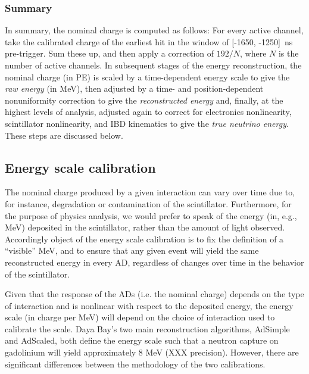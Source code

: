 \documentclass[../thesis.tex]{subfiles}
\begin{document}
\subsubsection{Summary}
\label{sec:reconChargeSummary}

In summary, the nominal charge is computed as follows: For every active channel, take the calibrated charge of the earliest hit in the window of [-1650, -1250]~ns pre-trigger. Sum these up, and then apply a correction of $192/N$, where $N$ is the number of active channels. In subsequent stages of the energy reconstruction, the nominal charge (in PE) is scaled by a time-dependent energy scale to give the \emph{raw energy} (in MeV), then adjusted by a time- and position-dependent nonuniformity correction to give the \emph{reconstructed energy} and, finally, at the highest levels of analysis, adjusted again to correct for electronics nonlinearity, scintillator nonlinearity, and IBD kinematics to give the \emph{true neutrino energy}. These steps are discussed below.

\subsection{Energy scale calibration}
\label{sec:reconEnergyScale}

The nominal charge produced by a given interaction can vary over time due to, for instance, degradation or contamination of the scintillator. Furthermore, for the purpose of physics analysis, we would prefer to speak of the energy (in, e.g., MeV) deposited in the scintillator, rather than the amount of light observed. Accordingly object of the energy scale calibration is to fix the definition of a ``visible'' MeV, and to ensure that any given event will yield the same reconstructed energy in every AD, regardless of changes over time in the behavior of the scintillator.

Given that the response of the ADs (i.e. the nominal charge) depends on the type of interaction and is nonlinear with respect to the deposited energy, the energy scale (in charge per MeV) will depend on the choice of interaction used to calibrate the scale. Daya Bay's two main reconstruction algorithms, AdSimple and AdScaled, both define the energy scale such that a neutron capture on gadolinium will yield approximately 8 MeV (XXX precision). However, there are significant differences between the methodology of the two calibrations.
\end{document}
